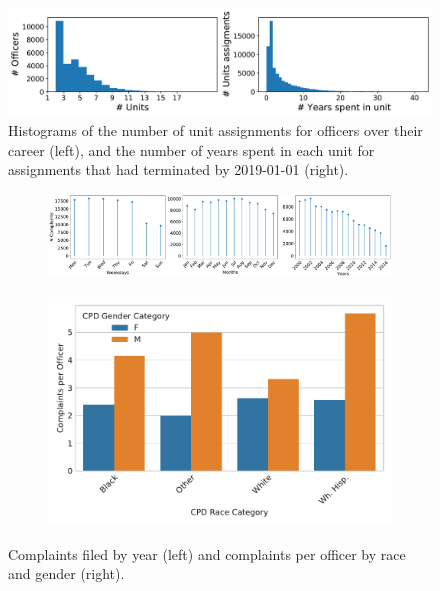 \begin{figure}[t!] 
	\includegraphics[width=\textwidth]{figs/units_officers} 
	\caption{Histograms of the number of unit assignments for
officers over their career (left), and the number of years spent in each unit for assignments that had terminated by 2019-01-01 (right).}
\label{fig:units}
\end{figure}

\begin{figure}[t!] 
\begin{subfigure}{0.44\textwidth}
	\includegraphics[width=\textwidth, clip, trim= 970 0 0 0]{figs/complaints_times} 
\end{subfigure}
\begin{subfigure}{0.52\textwidth}
	\includegraphics[width=\textwidth]{figs/complaints} 
\end{subfigure}
	\caption{Complaints filed by year (left) and complaints per officer by race and gender (right).} \label{fig:complaints}
\end{figure}
